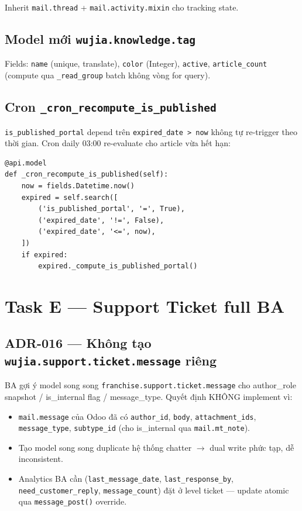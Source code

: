 Inherit \texttt{mail.thread} + \texttt{mail.activity.mixin} cho tracking state.

\subsection{Model mới \texttt{wujia.knowledge.tag}}

Fields: \texttt{name} (unique, translate), \texttt{color} (Integer), \texttt{active}, \texttt{article\_count} (compute qua \texttt{\_read\_group} batch không vòng for query).

\subsection{Cron \texttt{\_cron\_recompute\_is\_published}}

\texttt{is\_published\_portal} depend trên \texttt{expired\_date > now} không tự re-trigger theo thời gian. Cron daily 03:00 re-evaluate cho article vừa hết hạn:

\begin{lstlisting}[style=python]
@api.model
def _cron_recompute_is_published(self):
    now = fields.Datetime.now()
    expired = self.search([
        ('is_published_portal', '=', True),
        ('expired_date', '!=', False),
        ('expired_date', '<=', now),
    ])
    if expired:
        expired._compute_is_published_portal()
\end{lstlisting}

\section{Task E --- Support Ticket full BA}

\subsection{ADR-016 --- Không tạo \texttt{wujia.support.ticket.message} riêng}

BA gợi ý model song song \texttt{franchise.support.ticket.message} cho author\_role snapshot / is\_internal flag / message\_type. Quyết định KHÔNG implement vì:

\begin{itemize}[leftmargin=*]
    \item \texttt{mail.message} của Odoo đã có \texttt{author\_id}, \texttt{body}, \texttt{attachment\_ids}, \texttt{message\_type}, \texttt{subtype\_id} (cho is\_internal qua \texttt{mail.mt\_note}).
    \item Tạo model song song duplicate hệ thống chatter $\rightarrow$ dual write phức tạp, dễ inconsistent.
    \item Analytics BA cần (\texttt{last\_message\_date}, \texttt{last\_response\_by}, \texttt{need\_customer\_reply}, \texttt{message\_count}) đặt ở level ticket --- update atomic qua \texttt{message\_post()} override.
\end{itemize}

